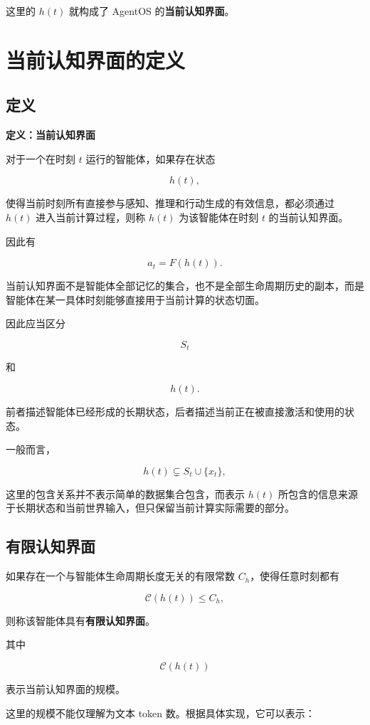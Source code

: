 这里的 $h(t)$ 就构成了 AgentOS 的\textbf{当前认知界面}。


\section{当前认知界面的定义}

\subsection{定义}

\textbf{定义：当前认知界面}

对于一个在时刻 $t$ 运行的智能体，如果存在状态

\[
h(t),
\]

使得当前时刻所有直接参与感知、推理和行动生成的有效信息，都必须通过 $h(t)$ 进入当前计算过程，则称 $h(t)$ 为该智能体在时刻 $t$ 的当前认知界面。

因此有

\[
a_t
=
F(h(t)).
\]

当前认知界面不是智能体全部记忆的集合，也不是全部生命周期历史的副本，而是智能体在某一具体时刻能够直接用于当前计算的状态切面。

因此应当区分

\[
S_t
\]

和

\[
h(t).
\]

前者描述智能体已经形成的长期状态，后者描述当前正在被直接激活和使用的状态。

一般而言，

\[
h(t)
\subsetneq S_t \cup \{x_t\},
\]

这里的包含关系并不表示简单的数据集合包含，而表示 $h(t)$ 所包含的信息来源于长期状态和当前世界输入，但只保留当前计算实际需要的部分。


\subsection{有限认知界面}

如果存在一个与智能体生命周期长度无关的有限常数 $C_h$，使得任意时刻都有

\[
\mathcal{C}(h(t))
\leq
C_h,
\]

则称该智能体具有\textbf{有限认知界面}。

其中

\[
\mathcal{C}(h(t))
\]

表示当前认知界面的规模。

这里的规模不能仅理解为文本 token 数。根据具体实现，它可以表示：

